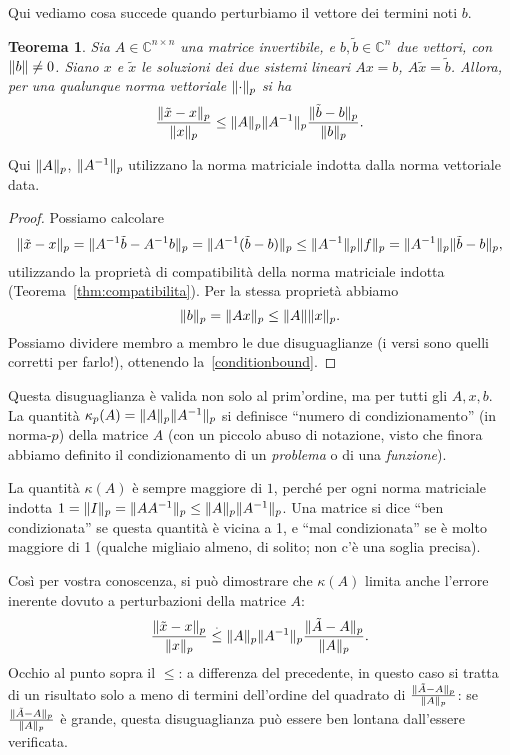 \documentclass[a4paper]{report}
\DeclarePairedDelimiter{\norm}{\lVert}{\rVert}
\newtheorem{theorem}{Teorema}[chapter]
\theoremstyle{definiton}
\theoremstyle{remark}
\begin{document}
Qui vediamo cosa succede quando perturbiamo il vettore dei termini noti $b$. 

\begin{theorem}
    Sia $A\in \mathbb{C}^{n\times n}$ una matrice invertibile, e $b,\tilde{b} \in \mathbb{C}^n$ due vettori, con $\norm{b}\neq 0$. Siano $x$ e $\tilde{x}$ le soluzioni dei due sistemi lineari $Ax=b$, $A\tilde{x}=\tilde{b}$. Allora, per una qualunque norma vettoriale $\norm{\cdot}_p$ si ha
    \begin{equation} \label{conditionbound}
        \frac{\norm{\tilde{x}-x}_p}{\norm{x}_p} \leq \norm{A}_p\norm{A^{-1}}_p \frac{\norm{\tilde{b}-b}_p}{\norm{b}_p}.    
    \end{equation}
\end{theorem}
Qui $\norm{A}_p$, $\norm{A^{-1}}_p$ utilizzano la norma matriciale indotta dalla norma vettoriale data.
\begin{proof}
Possiamo calcolare
\[
\norm{\tilde{x}-x}_p = \norm{A^{-1}\tilde{b} - A^{-1}b}_p = \norm{A^{-1}(\tilde{b}-b)}_p \leq \norm{A^{-1}}_p\norm{f}_p = \norm{A^{-1}}_p\norm{\tilde{b}-b}_p,
\]
utilizzando la proprietà di compatibilità della norma matriciale indotta (Teorema~\ref{thm:compatibilita}). Per la stessa proprietà abbiamo
\[
\norm{b}_p = \norm{Ax}_p \leq \norm{A}\norm{x}_p.
\]
Possiamo dividere membro a membro le due disuguaglianze (i versi sono quelli corretti per farlo!), ottenendo la~\eqref{conditionbound}.
\end{proof}

Questa disuguaglianza è valida non solo al prim'ordine, ma per tutti gli $A,x,b$. La quantità $\kappa_p(A) = \norm{A}_p\norm{A^{-1}}_p$ si definisce ``numero di condizionamento'' (in norma-$p$) della matrice $A$ (con un piccolo abuso di notazione, visto che finora abbiamo definito il condizionamento di un \emph{problema} o di una \emph{funzione}).


La quantità $\kappa(A)$ è sempre maggiore di $1$, perché per ogni norma matriciale indotta $1 = \norm{I}_p = \norm{AA^{-1}}_p \leq \norm{A}_p\norm{A^{-1}}_p$. Una matrice si dice ``ben condizionata'' se questa quantità è vicina a 1, e ``mal condizionata'' se è molto maggiore di 1 (qualche migliaio almeno, di solito; non c'è una soglia precisa).

Così per vostra conoscenza, si può dimostrare che $\kappa(A)$ limita anche l'errore inerente dovuto a perturbazioni della matrice $A$:
\[
\frac{\norm{\tilde{x}-x}_p}{\norm{x}_p} \mathrel{\stackrel{.}{\leq}} \norm{A}_p\norm{A^{-1}}_p \frac{\norm{\tilde{A}-A}_p}{\norm{A}_p}.
\]
Occhio al punto sopra il $\leq$: a differenza del precedente, in questo caso si tratta di un risultato solo a meno di termini dell'ordine del quadrato di $\frac{\norm{\tilde{A}-A}_p}{\norm{A}_p}$: se $\frac{\norm{\tilde{A}-A}_p}{\norm{A}_p}$ è grande, questa disuguaglianza può essere ben lontana dall'essere verificata.
\end{document}
